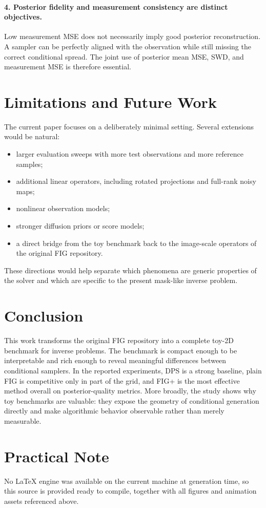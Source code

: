 \documentclass[10pt,twocolumn]{article}
\begin{document}
\paragraph{4. Posterior fidelity and measurement consistency are distinct objectives.}
Low measurement MSE does not necessarily imply good posterior reconstruction. A sampler can be perfectly aligned with the observation while still missing the correct conditional spread. The joint use of posterior mean MSE, SWD, and measurement MSE is therefore essential.

\section{Limitations and Future Work}

The current paper focuses on a deliberately minimal setting. Several extensions would be natural:
\begin{itemize}[leftmargin=1.5em]
    \item larger evaluation sweeps with more test observations and more reference samples;
    \item additional linear operators, including rotated projections and full-rank noisy maps;
    \item nonlinear observation models;
    \item stronger diffusion priors or score models;
    \item a direct bridge from the toy benchmark back to the image-scale operators of the original FIG repository.
\end{itemize}

These directions would help separate which phenomena are generic properties of the solver and which are specific to the present mask-like inverse problem.

\section{Conclusion}

This work transforms the original FIG repository into a complete toy-2D benchmark for inverse problems. The benchmark is compact enough to be interpretable and rich enough to reveal meaningful differences between conditional samplers. In the reported experiments, DPS is a strong baseline, plain FIG is competitive only in part of the grid, and FIG+ is the most effective method overall on posterior-quality metrics. More broadly, the study shows why toy benchmarks are valuable: they expose the geometry of conditional generation directly and make algorithmic behavior observable rather than merely measurable.

\section*{Practical Note}

No LaTeX engine was available on the current machine at generation time, so this source is provided ready to compile, together with all figures and animation assets referenced above.
\end{document}

